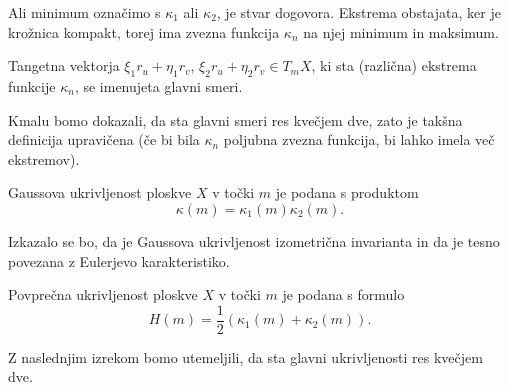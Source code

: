 \begin{opomba}
 Ali minimum označimo s $\kappa_1$ ali $\kappa_2$, je stvar dogovora. Ekstrema obstajata, ker je krožnica kompakt, torej ima zvezna funkcija $\kappa_n$ na njej minimum in maksimum.
\end{opomba}

\begin{definicija}
\label{def_glavni_smeri}
 Tangetna vektorja $\xi_1 r_u  + \eta_1 r_v$, $\xi_2 r_u  + \eta_2 r_v \in T_mX$, ki sta (različna) ekstrema funkcije $\kappa_n$, se imenujeta glavni smeri.
\end{definicija}

\begin{opomba}
 Kmalu bomo dokazali, da sta glavni smeri res kvečjem dve, zato je takšna definicija upravičena (če bi bila $\kappa_n$ poljubna zvezna funkcija, bi lahko imela več ekstremov).
\end{opomba}

\begin{definicija}
\label{def_Gaussova_ukrivljenost}
 Gaussova ukrivljenost ploskve $X$ v točki $m$ je podana s produktom 
 \begin{equation*} \kappa(m) = \kappa_1(m) \kappa_2(m).\end{equation*}
\end{definicija}

\begin{opomba}
 Izkazalo se bo, da je Gaussova ukrivljenost izometrična invarianta in da je tesno povezana z Eulerjevo karakteristiko.
\end{opomba}


\begin{definicija}
\label{def_povprecna_ukrivljenost}
    Povprečna ukrivljenost ploskve $X$ v točki $m$ je podana s formulo 
    \begin{equation*} H(m) = \frac{1}{2} (\kappa_1(m) + \kappa_2(m) ).\end{equation*}
\end{definicija}

Z naslednjim izrekom bomo utemeljili, da sta glavni ukrivljenosti res kvečjem dve. 

